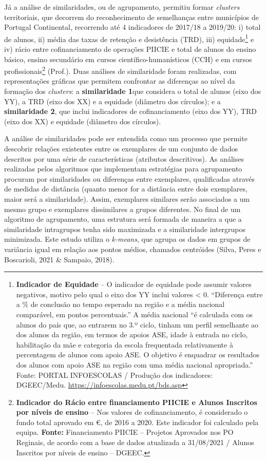 \documentclass[
]{book}
\begin{document}
Já a análise de similaridades, ou de agrupamento, permitiu formar \emph{clusters} territoriais, que decorrem do reconhecimento de semelhanças entre municípios de Portugal Continental, recorrendo até 4 indicadores de 2017/18 a 2019/20: i) total de alunos, ii) média das taxas de retenção e desistência (TRD), iii) equidade\footnote{\textbf{Indicador de Equidade} -- O indicador de equidade pode assumir valores negativos, motivo pelo qual o eixo dos YY inclui valores \textless{} 0. ``Diferença entre a \% de conclusão no tempo esperado na região e a média nacional comparável, em pontos percentuais.'' A média nacional ``é calculada com os alunos do país que, ao entrarem no 3.º ciclo, tinham um perfil semelhante ao dos alunos da região, em termos de apoios ASE, idade à entrada no ciclo, habilitação da mãe e categoria da escola frequentada relativamente à percentagem de alunos com apoio ASE. O objetivo é enquadrar os resultados dos alunos com apoio ASE na região com uma média nacional apropriada.'' Fonte: PORTAL INFOESCOLAS / Produção dos indicadores: DGEEC/Medu. \url{https://infoescolas.medu.pt/bds.asp}} e iv) rácio entre cofinanciamento de operações PIICIE e total de alunos do ensino básico, ensino secundário em cursos científico-humanísticos (CCH) e em cursos profissionais\footnote{\textbf{Indicador do Rácio entre financiamento PIICIE e Alunos Inscritos por níveis de ensino} -- Nos valores de cofinanciamento, é considerado o fundo total aprovado em €, de 2016 a 2020. Este indicador foi calculado pela equipa. \textbf{Fonte:} Financiamento PIICIE -- Projetos Aprovados nos PO Reginais, de acordo com a base de dados atualizada a 31/08/2021 / Alunos Inscritos por níveis de ensino -- DGEEC.} (Prof.). Duas análises de similaridade foram realizadas, com representações gráficas que permitem confrontar as diferenças ao nível da formação dos \emph{clusters}: a \textbf{similaridade 1}que considera o total de alunos (eixo dos YY), a TRD (eixo dos XX) e a equidade (diâmetro dos círculos); e a \textbf{similaridade 2}, que inclui indicadores de cofinanciamento (eixo dos YY), TRD (eixo dos XX) e equidade (diâmetro dos círculos).

A análise de similaridades pode ser entendida como um processo que permite descobrir relações existentes entre os exemplares de um conjunto de dados descritos por uma série de características (atributos descritivos). As análises realizadas pelos algoritmos que implementam estratégias para agrupamento procuram por similaridades ou diferenças entre exemplares, qualificadas através de medidas de distância (quanto menor for a distância entre dois exemplares, maior será a similaridade). Assim, exemplares similares serão associados a um mesmo grupo e exemplares dissimilares a grupos diferentes. No final de um algoritmo de agrupamento, uma estrutura será formada de maneira a que a similaridade intragrupos tenha sido maximizada e a similaridade intergrupos minimizada. Este estudo utiliza o \emph{k-means}, que agrupa os dados em grupos de variância igual em relação aos pontos médios, chamados centróides (Silva, Peres e Boscarioli, 2021 \& Sampaio, 2018).
\end{document}

